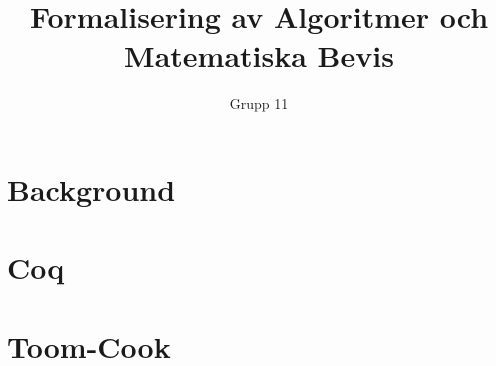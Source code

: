 \documentclass[a4paper]{article}
\author{Grupp 11}
\title{Formalisering av Algoritmer och Matematiska Bevis}
\begin{document}
\maketitle
\thispagestyle{empty}
\newpage
\tableofcontents
\newpage

\section{Background}
\section{Coq}
\section{Toom-Cook}
\end{document}
